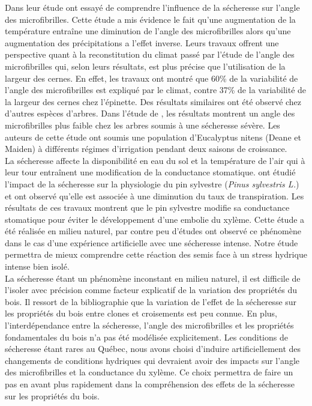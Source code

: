 \documentclass[a4paper,12pt]{report}
\begin{document}
\begin{itemize}
	Dans leur étude \cite{Xu2012} ont essayé de comprendre l'influence de la sécheresse sur l'angle des microfibrilles. Cette étude a mis évidence le fait qu'une augmentation de la température entraîne une diminution de l'angle des microfibrilles alors qu'une augmentation des précipitations a l'effet inverse. Leurs travaux offrent une perspective quant à la reconstitution du climat passé par l'étude de l'angle des microfibrilles qui, selon leurs résultats, est plus précise que l'utilisation de la largeur des cernes. En effet, les travaux ont montré que 60\% de la variabilité de l'angle des microfibrilles est expliqué par le climat, contre 37\% de la variabilité de la largeur des cernes chez l'épinette. Des résultats similaires ont été observé chez d'autres espèces d'arbres. Dans l'étude de \cite{Wimmer2002}, les résultats montrent un angle des microfibrilles plus faible chez les arbres soumis à une sécheresse sévère. Les auteurs de cette étude ont soumis une population d'Eucalyptus nitens (Deane et Maiden) à différents régimes d'irrigation pendant deux saisons de croissance.\\
	
	La sécheresse affecte la disponibilité en eau du sol et la température de l'air qui à leur tour entraînent une modification de la conductance stomatique. \cite{Irvine1997} ont étudié l'impact de la sécheresse sur la physiologie du pin sylvestre (\textit{Pinus sylvestris L.})%
	et ont observé qu'elle est associée à une diminution du taux de transpiration. Les résultats de ces travaux montrent que le pin sylvestre modifie sa conductance stomatique pour éviter le développement d'une embolie du xylème. Cette étude a été réalisée en milieu naturel, par contre peu d'études ont observé ce phénomène dans le cas d'une expérience artificielle avec une sécheresse intense. Notre étude permettra de mieux comprendre cette réaction des semis face à un stress hydrique intense bien isolé.\\
	
	 La sécheresse étant un phénomène inconstant en milieu naturel, il est difficile de l'isoler avec précision comme facteur explicatif de la variation des propriétés du bois. Il ressort de la bibliographie que la variation de l'effet de la sécheresse sur les propriétés du bois entre clones et croisements est peu connue. En plus, l'interdépendance entre la sécheresse, l'angle des microfibrilles et les propriétés fondamentales du bois n'a pas été modélisée explicitement. Les conditions de sécheresse étant rares au Québec, nous avons choisi d'induire artificiellement des changements de conditions hydriques qui devraient avoir des impacts sur l'angle des microfibrilles et la conductance du xylème. Ce choix permettra de faire un pas en avant plus rapidement dans la compréhension des effets de la sécheresse sur les propriétés du bois.\\
		

\end{itemize}
\end{document}
